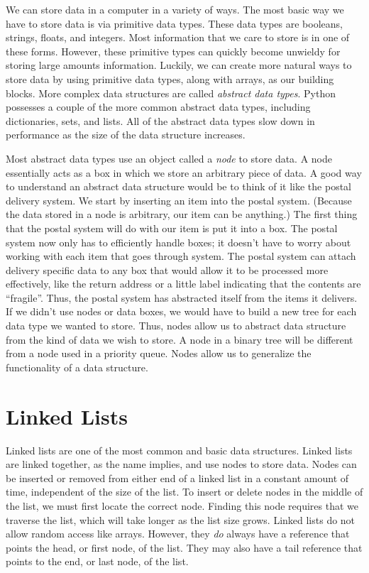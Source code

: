 \label{lab:Python_DataStructures}

We can store data in a computer in a variety of ways.
The most basic way we have to store data is via primitive data types.
These data types are booleans, strings, floats, and integers.
Most information that we care to store is in one of these forms.
However, these primitive types can quickly become unwieldy for storing large amounts information.
Luckily, we can create more natural ways to store data by using primitive data types, along with arrays, as our building blocks.
More complex data structures are called \emph{abstract data types}.
Python possesses a couple of the more common abstract data types, including dictionaries, sets, and lists.
All of the abstract data types slow down in performance as the size of the data structure increases.

Most abstract data types use an object called a \emph{node} to store data.
A node essentially acts as a box in which we store an arbitrary piece of data.
A good way to understand an abstract data structure would be to think of it like the postal delivery system.
We start by inserting an item into the postal system.  (Because the data stored in a node is arbitrary, our item can be anything.)
The first thing that the postal system will do with our item is put it into a box.
The postal system now only has to efficiently handle boxes;
it doesn't have to worry about working with each item that goes through system.
The postal system can attach delivery specific data to any box that would allow it to be processed more effectively, 
like the return address or a little label indicating that the contents are ``fragile''.
Thus, the postal system has abstracted itself from the items it delivers.
If we didn't use nodes or data boxes, we would have to build a new tree for each data type we wanted to store.
Thus, nodes allow us to abstract data structure from the kind of data we wish to store.
A node in a binary tree will be different from a node used in a priority queue.
Nodes allow us to generalize the functionality of a data structure.

\section*{Linked Lists}
Linked lists are one of the most common and basic data structures.
Linked lists are linked together, as the name implies, and use nodes to store data.
Nodes can be inserted or removed from either end of a linked list in a constant amount of time, independent of the size of the list.
To insert or delete nodes in the middle of the list, we must first locate the correct node.
Finding this node requires that we traverse the list, which will take longer as the list size grows.
Linked lists do not allow random access like arrays.
However, they \emph{do} always have a reference that points the head, or first node, of the list.
They may also have a tail reference that points to the end, or last node, of the list.


